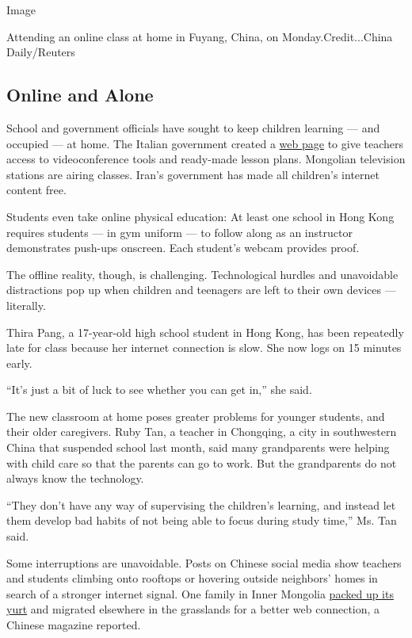 Image

Attending an online class at home in Fuyang, China, on
Monday.Credit...China Daily/Reuters

\hypertarget{online-and-alone}{%
\subsection{Online and Alone}\label{online-and-alone}}

School and government officials have sought to keep children learning
--- and occupied --- at home. The Italian government created a
\href{https://www.istruzione.it/coronavirus/didattica-a-distanza.html}{web
page} to give teachers access to videoconference tools and ready-made
lesson plans. Mongolian television stations are airing classes. Iran's
government has made all children's internet content free.

Students even take online physical education: At least one school in
Hong Kong requires students --- in gym uniform --- to follow along as an
instructor demonstrates push-ups onscreen. Each student's webcam
provides proof.

The offline reality, though, is challenging. Technological hurdles and
unavoidable distractions pop up when children and teenagers are left to
their own devices --- literally.

Thira Pang, a 17-year-old high school student in Hong Kong, has been
repeatedly late for class because her internet connection is slow. She
now logs on 15 minutes early.

``It's just a bit of luck to see whether you can get in,'' she said.

The new classroom at home poses greater problems for younger students,
and their older caregivers. Ruby Tan, a teacher in Chongqing, a city in
southwestern China that suspended school last month, said many
grandparents were helping with child care so that the parents can go to
work. But the grandparents do not always know the technology.

``They don't have any way of supervising the children's learning, and
instead let them develop bad habits of not being able to focus during
study time,'' Ms. Tan said.

Some interruptions are unavoidable. Posts on Chinese social media show
teachers and students climbing onto rooftops or hovering outside
neighbors' homes in search of a stronger internet signal. One family in
Inner Mongolia \href{https://m.weibo.cn/status/4478077407118555?}{packed
up its yurt} and migrated elsewhere in the grasslands for a better web
connection, a Chinese magazine reported.

